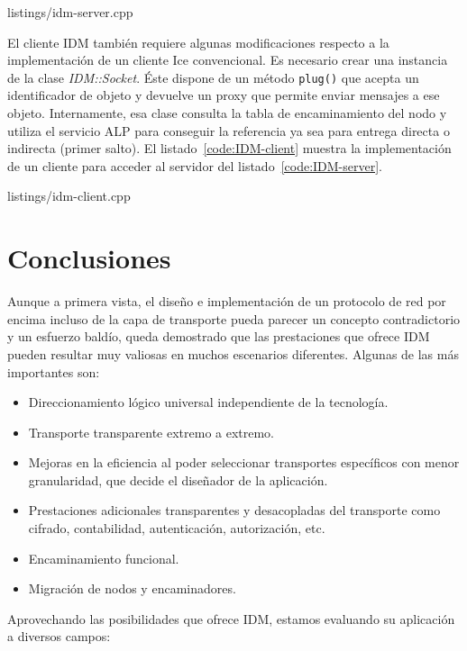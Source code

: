 \documentclass{arco-article}
\newcommand{\function}[1]{\texttt{#1}}
\newcommand{\iface}[1]{\textit{#1}}
\begin{document}

{listings/idm-server.cpp}

El cliente \ac{IDM} también requiere algunas modificaciones respecto a
la implementación de un cliente \ac{Ice} convencional.  Es necesario
crear una instancia de la clase \iface{IDM::Socket}.  Éste dispone de
un método \function{plug()} que acepta un identificador de objeto y
devuelve un proxy que permite enviar mensajes a ese objeto.
Internamente, esa clase consulta la tabla de encaminamiento del nodo y
utiliza el servicio \ac{ALP} para conseguir la referencia ya sea para
entrega directa o indirecta (primer salto).  El
listado~\ref{code:IDM-client} muestra la implementación de un cliente
para acceder al servidor del listado~\ref{code:IDM-server}.


{listings/idm-client.cpp}


\section{Conclusiones}

Aunque a primera vista, el diseño e implementación de un protocolo de
red por encima incluso de la capa de transporte pueda parecer un
concepto contradictorio y un esfuerzo baldío, queda demostrado que las
prestaciones que ofrece \ac{IDM} pueden resultar muy valiosas en
muchos escenarios diferentes.  Algunas de las más importantes son:

\begin{itemize}
\item Direccionamiento lógico universal independiente de la tecnología.
\item Transporte transparente extremo a extremo.
\item Mejoras en la eficiencia al poder seleccionar transportes
  específicos con menor granularidad, que decide el diseñador de la
  aplicación.
\item Prestaciones adicionales transparentes y desacopladas del
  transporte como cifrado, contabilidad, autenticación, autorización,
  etc.
\item Encaminamiento funcional.
\item Migración de nodos y encaminadores.
\end{itemize}

Aprovechando las posibilidades que ofrece \ac{IDM}, estamos evaluando su
aplicación a diversos campos:
\end{document}
